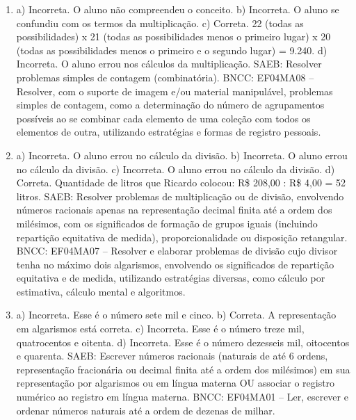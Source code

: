 \begin{enumerate}
\item
a) Incorreta. O aluno não compreendeu o conceito.
b) Incorreta. O aluno se confundiu com os termos da multiplicação.
c) Correta. 22 (todas as possibilidades) x 21 (todas as possibilidades menos o primeiro lugar) x 20 (todas as possibilidades menos o primeiro e o segundo lugar) = 9.240.
d) Incorreta. O aluno errou nos cálculos da multiplicação.
SAEB: Resolver problemas simples de contagem (combinatória).
BNCC: EF04MA08 -- Resolver, com o suporte de imagem e/ou material manipulável, problemas simples
de contagem, como a determinação do número de agrupamentos possíveis ao se combinar cada
elemento de uma coleção com todos os elementos de outra, utilizando estratégias e formas de
registro pessoais.

\item
a) Incorreta. O aluno errou no cálculo da divisão.
b) Incorreta. O aluno errou no cálculo da divisão.
c) Incorreta. O aluno errou no cálculo da divisão.
d) Correta. Quantidade de litros que Ricardo colocou: R\$ 208,00 : R\$ 4,00 = 52
litros.
SAEB: Resolver problemas de multiplicação ou de divisão,
envolvendo números racionais apenas na representação decimal finita até
a ordem dos milésimos, com os significados de formação de grupos iguais
(incluindo repartição equitativa de medida), proporcionalidade ou
disposição retangular.
BNCC: EF04MA07 -- Resolver e elaborar problemas de divisão cujo divisor tenha no máximo dois algarismos,
envolvendo os significados de repartição equitativa e de medida, utilizando estratégias diversas,
como cálculo por estimativa, cálculo mental e algoritmos.

\item
a) Incorreta. Esse é o número sete mil e cinco.
b) Correta. A representação em algarismos está correta.
c) Incorreta. Esse é o número treze mil, quatrocentos e oitenta.
d) Incorreta. Esse é o número dezesseis mil, oitocentos e quarenta.
SAEB: Escrever números racionais (naturais de até 6 ordens, representação
fracionária ou decimal finita até a ordem dos milésimos) em sua
representação por algarismos ou em língua materna OU associar o registro
numérico ao registro em língua materna.
BNCC: EF04MA01 -- Ler, escrever e ordenar números naturais até a ordem de dezenas de milhar.
\end{enumerate}


